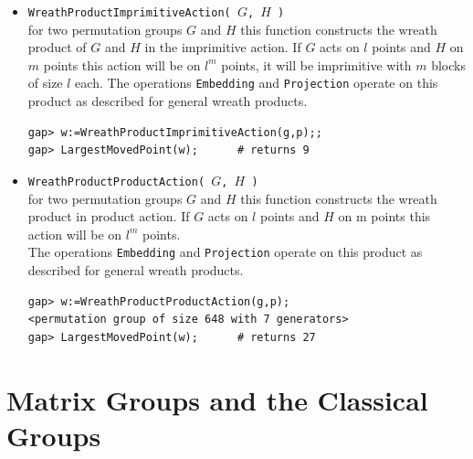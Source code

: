\begin{itemize}
{\begin{verbatim}
\end{verbatim}}
\item {\tt WreathProductImprimitiveAction( $G$, $H$ )}\\
for two permutation groups $G$ and $H$ this function constructs the wreath product of $G$ and $H$ in the
imprimitive action. If $G$ acts on $l$ points and $H$ on $m$ points this action will
be on $l^m$ points, it will be imprimitive with $m$ blocks of size $l$ each.
The operations {\tt Embedding} and {\tt Projection} operate on this product as described for general wreath products.
{\codesize
\begin{verbatim}
gap> w:=WreathProductImprimitiveAction(g,p);;
gap> LargestMovedPoint(w);      # returns 9

\end{verbatim}}
\item {\tt WreathProductProductAction( $G$, $H$ )}\\
for two permutation groups $G$ and $H$ this function constructs the wreath product in
product action. If $G$ acts on $l$ points and $H$ on m points this action will be on
$l^m$ points.
\\[4pt]
The operations {\tt Embedding} and {\tt Projection} operate on this product as described for general wreath products.
{\codesize
\begin{verbatim}
gap> w:=WreathProductProductAction(g,p);
<permutation group of size 648 with 7 generators>
gap> LargestMovedPoint(w);      # returns 27
\end{verbatim}}
\end{itemize}

\newpage

\section{Matrix Groups and the Classical Groups}
